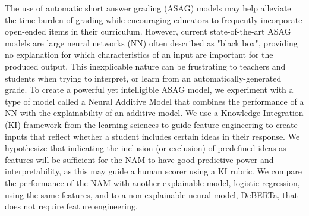 The use of automatic short answer grading (ASAG) models may help alleviate the time burden of grading while encouraging educators to frequently incorporate open-ended items in their curriculum. However, current state-of-the-art ASAG models are large neural networks (NN) often described as "black box", providing no explanation for which characteristics of an input are important for the produced output. This inexplicable nature can be frustrating to teachers and students when trying to interpret, or learn from an automatically-generated grade. To create a powerful yet intelligible ASAG model, we experiment with a type of model called a Neural Additive Model that combines the performance of a NN with the explainability of an additive model. We use a Knowledge Integration (KI) framework from the learning sciences to guide feature engineering to create inputs that reflect whether a student includes certain ideas in their response. We hypothesize that indicating the inclusion (or exclusion) of predefined ideas as features will be sufficient for the NAM to have good predictive power and interpretability, as this may guide a human scorer using a KI rubric. We compare the performance of the NAM with another explainable model, logistic regression, using the same features, and to a non-explainable neural model, DeBERTa, that does not require feature engineering.


